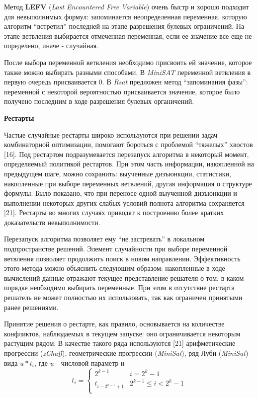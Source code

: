 Метод \textbf{LEFV} (\textit{Last Encountered Free Variable}) очень быстр и хорошо подходит для невыполнимых формул: запоминается неопределенная переменная, которую алгоритм \enquote{встретил} последней на этапе разрешения булевых ограничений. На этапе ветвления выбирается отмеченная переменная, если ее значение все еще не определено, иначе - случайная.

После выбора переменной ветвления необходимо присвоить ей значение, которое также можно выбирать разными способами. В \textit{MiniSAT} переменной ветвления в первую очередь присваивается $0$. В \textit{Rsat} предложен метод \enquote{запоминания фазы}: переменной с некоторой вероятностью присваивается значение, которое было получено последним в ходе разрешения булевых органичений.

\textbf{Рестарты}

Частые случайные рестарты широко используются при решении задач комбинаторной оптимизации, помогают бороться с проблемой \enquote{тяжелых} хвостов [16]. Под рестартом подразумевается перезапуск алгоритма в некоторый момент, определяемый политикой рестартов. При этом часть информации, накопленной на предыдущем шаге, можно сохранить: выученные дизъюнкции, статистики, накопленные при выборе переменных ветвлений, другая информация о структуре формулы. Было показано, что при переносе одной выученной дизъюнкции и выполнении некоторых других слабых условий полнота алгоритма сохраняется [21]. Рестарты во многих случаях приводят к построению более кратких доказательств невыполнимости.

Перезапуск алгоритма позволяет ему \enquote{не застревать} в локальном подпространстве решений. Элемент случайности при выборе переменной ветвления позволяет продолжить поиск в новом направлении. Эффективность этого метода можно объяснить следующим образом: накопленные в ходе вычислений данные отражают текущее представление решателя о том, в каком порядке необходимо выбирать переменные. При этом в отсутствие рестарта решатель не может полностью их использовать, так как ограничен принятыми ранее решениями.

Принятие решения о рестарте, как правило, основывается на количестве конфликтов, наблюдаемых в текущем запуске: 
оно ограничивается некоторым растущим рядом. В качестве такого ряда используются [21] арифметические прогрессии (\textit{zChaff}), геометрические прогрессии (\textit{MiniSat}), ряд Луби (\textit{MiniSat}) вида $u * t_i$, где $u$ - числовой параметр и 
\begin{equation*}
t_i = 
\begin{cases}
2^{k-1} & i = 2^k - 1 \\
t_{i - 2^{k-1} + 1} & 2^{k-1} \leq i < 2^k - 1 \\
\end{cases}
\end{equation*}

